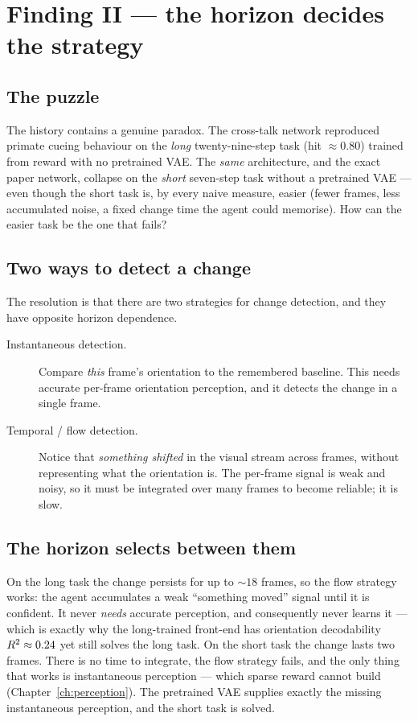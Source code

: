 \chapter{Finding II --- the horizon decides the strategy}
\label{ch:horizon}

\section{The puzzle}
The history contains a genuine paradox. The cross-talk network reproduced primate cueing
behaviour on the \emph{long} twenty-nine-step task (hit $\approx0.80$) trained from reward
with no pretrained VAE. The \emph{same} architecture, and the exact paper network, collapse
on the \emph{short} seven-step task without a pretrained VAE --- even though the short task
is, by every naive measure, easier (fewer frames, less accumulated noise, a fixed change
time the agent could memorise). How can the easier task be the one that fails?

\section{Two ways to detect a change}
The resolution is that there are two strategies for change detection, and they have
opposite horizon dependence.
\begin{description}
\item[Instantaneous detection.] Compare \emph{this} frame's orientation to the remembered
baseline. This needs accurate per-frame orientation perception, and it detects the change
in a single frame.
\item[Temporal / flow detection.] Notice that \emph{something shifted} in the visual stream
across frames, without representing what the orientation is. The per-frame signal is weak
and noisy, so it must be integrated over many frames to become reliable; it is slow.
\end{description}

\section{The horizon selects between them}
On the long task the change persists for up to $\sim\!18$ frames, so the flow strategy
works: the agent accumulates a weak ``something moved'' signal until it is confident. It
never \emph{needs} accurate perception, and consequently never learns it --- which is
exactly why the long-trained front-end has orientation decodability $R^{2}\approx0.24$ yet
still solves the long task. On the short task the change lasts two frames. There is no time
to integrate, the flow strategy fails, and the only thing that works is instantaneous
perception --- which sparse reward cannot build (Chapter~\ref{ch:perception}). The
pretrained VAE supplies exactly the missing instantaneous perception, and the short task is
solved.

